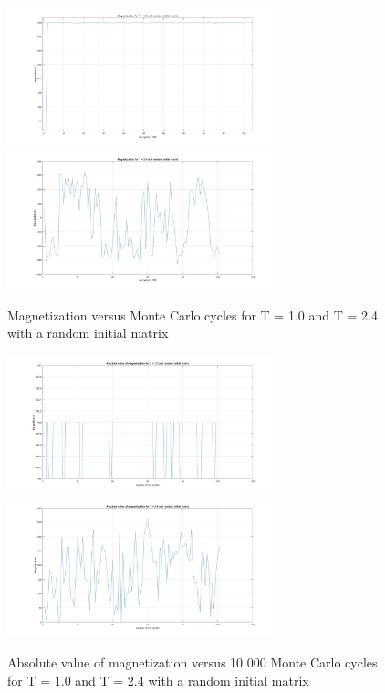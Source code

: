 \documentclass[10pt,a4paper]{article}
\begin{document}
\begin{figure}[H]
\centerline{
\includegraphics[width=0.7\textwidth]{magnetizationT1random}
\includegraphics[width=0.7\textwidth]{magnetizationT24random}
}
\caption{Magnetization versus Monte Carlo cycles for T = 1.0 and T = 2.4 with a random initial matrix}
\label{fig:magneticrandom}
\end{figure}

\begin{figure}[H]
\centerline{
\includegraphics[width=0.7\textwidth]{absmagnetizationT1random}
\includegraphics[width=0.7\textwidth]{absmagnetizationT24random}
}
\caption{Absolute value of magnetization versus 10 000 Monte Carlo cycles for T = 1.0 and T = 2.4 with a random initial matrix}
\label{fig:absmagneticrandom}
\end{figure}
\end{document}
